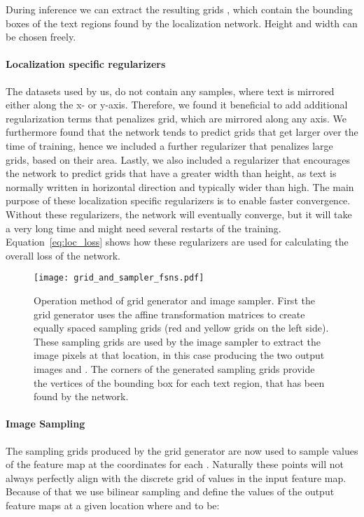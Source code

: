 \documentclass[letterpaper]{article}
\begin{document}
		During inference we can extract the  resulting grids , which contain the bounding boxes of the text regions found by the localization network.
		Height  and width  can be chosen freely.

	\paragraph{Localization specific regularizers}
		The datasets used by us, do not contain any samples, where text is mirrored either along the x- or y-axis.
		Therefore, we found it beneficial to add additional regularization terms that penalizes grid, which are mirrored along any axis.
		We furthermore found that the network tends to predict grids that get larger over the time of training, hence we included a further regularizer that penalizes large grids, based on their area.
		Lastly, we also included a regularizer that encourages the network to predict grids that have a greater width than height, as text is normally written in horizontal direction and typically wider than high.
		The main purpose of these localization specific regularizers is to enable faster convergence.
		Without these regularizers, the network will eventually converge, but it will take a very long time and might need several restarts of the training.
		Equation~\ref{eq:loc_loss} shows how these regularizers are used for calculating the overall loss of the network.

	\begin{figure}[t]
		\centering
		\texttt{[image: grid\_and\_sampler\_fsns.pdf]}
		\caption{Operation method of grid generator and image sampler. First the grid generator uses the  affine transformation matrices  to create  equally spaced sampling grids (red and yellow grids on the left side). These sampling grids are used by the image sampler to extract the image pixels at that location, in this case producing the two output images  and . The corners of the generated sampling grids provide the vertices of the bounding box for each text region, that has been found by the network.}
		\label{fig:transformation_params_overview}
	\end{figure}

	\paragraph{Image Sampling}
		The  sampling grids  produced by the grid generator are now used to sample values of the feature map  at the coordinates  for each . Naturally these points will not always perfectly align with the discrete grid of values in the input feature map.
		Because of that we use bilinear sampling and define the values of the  output feature maps  at a given location  where  and  to be:
		
\end{document}
